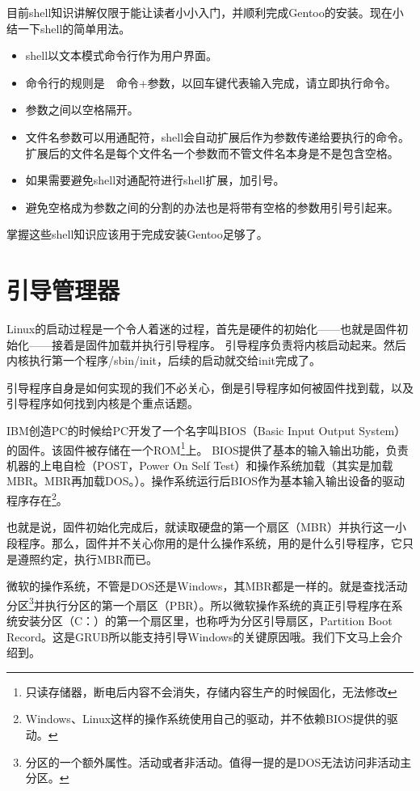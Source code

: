 目前shell知识讲解仅限于能让读者小小入门，并顺利完成Gentoo的安装。现在小结一下shell的简单用法。

\begin{itemize}
\item shell以文本模式命令行作为用户界面。
\item 命令行的规则是　命令+参数，以回车键代表输入完成，请立即执行命令。
\item 参数之间以空格隔开。
\item 文件名参数可以用通配符，shell会自动扩展后作为参数传递给要执行的命令。扩展后的文件名是每个文件名一个参数而不管文件名本身是不是包含空格。
\item 如果需要避免shell对通配符进行shell扩展，加引号。
\item 避免空格成为参数之间的分割的办法也是将带有空格的参数用引号引起来。
\end{itemize}

掌握这些shell知识应该用于完成安装Gentoo足够了。


\section{引导管理器}\label{sec:grub}
Linux的启动过程是一个令人着迷的过程，首先是硬件的初始化——也就是固件初始化——接着是固件加载并执行引导程序。
引导程序负责将内核启动起来。然后内核执行第一个程序/sbin/init，后续的启动就交给init完成了。

引导程序自身是如何实现的我们不必关心，倒是引导程序如何被固件找到载，以及引导程序如何找到内核是个重点话题。

IBM创造PC的时候给PC开发了一个名字叫BIOS（Basic Input Output System）的固件。该固件被存储在一个ROM\footnote{只读存储器，断电后内容不会消失，存储内容生产的时候固化，无法修改}上。 BIOS提供了基本的输入输出功能，负责机器的上电自检（POST，Power On Self Test）和操作系统加载（其实是加载MBR。MBR再加载DOS。）。操作系统运行后BIOS作为基本输入输出设备的驱动程序存在\footnote{Windows、Linux这样的操作系统使用自己的驱动，并不依赖BIOS提供的驱动。}。

也就是说，固件初始化完成后，就读取硬盘的第一个扇区（MBR）并执行这一小段程序。那么，固件并不关心你用的是什么操作系统，用的是什么引导程序，它只是遵照约定，执行MBR而已。

微软的操作系统，不管是DOS还是Windows，其MBR都是一样的。就是查找活动分区\footnote{分区的一个额外属性。活动或者非活动。值得一提的是DOS无法访问非活动主分区。}并执行分区的第一个扇区（PBR）。所以微软操作系统的真正引导程序在系统安装分区（C：）的第一个扇区里，也称呼为分区引导扇区，Partition Boot Record。这是GRUB所以能支持引导Windows的关键原因哦。我们下文马上会介绍到。

